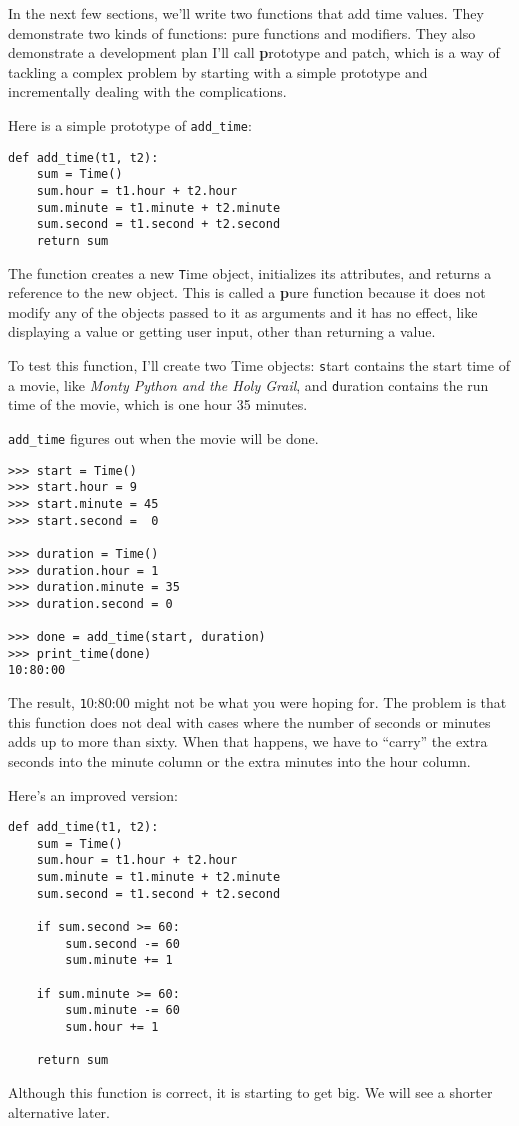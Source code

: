\documentclass[
DIV=11,
fontsize=13,
twoside,
headinclude=false,
titlepage=firstiscover,
abstract=true,
headsepline=true,
footsepline=true,
chapterprefix=true, %
headings=big,
bibliography=totoc,%
captions=tableheading
]{scrbook}
\theoremstyle{definition}
\begin{document}
In the next few sections, we'll write two functions that add time
values.  They demonstrate two kinds of functions: pure functions and
modifiers.  They also demonstrate a development plan I'll call {\textbf
  prototype and patch}, which is a way of tackling a complex problem
by starting with a simple prototype and incrementally dealing with the
complications.

Here is a simple prototype of \verb"add_time":

\begin{lstlisting}
def add_time(t1, t2):
    sum = Time()
    sum.hour = t1.hour + t2.hour
    sum.minute = t1.minute + t2.minute
    sum.second = t1.second + t2.second
    return sum
\end{lstlisting}
%
The function creates a new {\texttt Time} object, initializes its
attributes, and returns a reference to the new object.  This is called
a {\textbf pure function} because it does not modify any of the objects
passed to it as arguments and it has no effect,
like displaying a value or getting user input, 
other than returning a value.

To test this function, I'll create two Time objects: {\texttt start}
contains the start time of a movie, like {\em Monty Python and the
Holy Grail}, and {\texttt duration} contains the run time of the movie,
which is one hour 35 minutes.

\verb"add_time" figures out when the movie will be done.

\begin{lstlisting}
>>> start = Time()
>>> start.hour = 9
>>> start.minute = 45
>>> start.second =  0

>>> duration = Time()
>>> duration.hour = 1
>>> duration.minute = 35
>>> duration.second = 0

>>> done = add_time(start, duration)
>>> print_time(done)
10:80:00
\end{lstlisting}
%
The result, {\texttt 10:80:00} might not be what you were hoping
for.  The problem is that this function does not deal with cases where the
number of seconds or minutes adds up to more than sixty.  When that
happens, we have to ``carry'' the extra seconds into the minute column
or the extra minutes into the hour column.

Here's an improved version:

\begin{lstlisting}
def add_time(t1, t2):
    sum = Time()
    sum.hour = t1.hour + t2.hour
    sum.minute = t1.minute + t2.minute
    sum.second = t1.second + t2.second

    if sum.second >= 60:
        sum.second -= 60
        sum.minute += 1

    if sum.minute >= 60:
        sum.minute -= 60
        sum.hour += 1

    return sum
\end{lstlisting}
%
Although this function is correct, it is starting to get big.
We will see a shorter alternative later.
\end{document}
